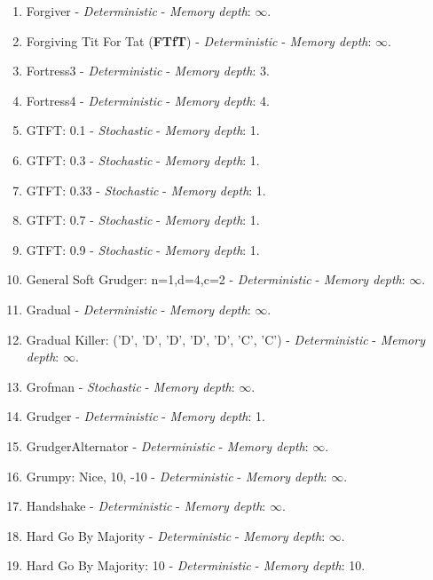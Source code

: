 \documentclass[10pt,letterpaper]{article}
\begin{document}
\begin{enumerate}
\item Forgiver - \textit{Deterministic} - \textit{Memory depth}: \(\infty\). \cite{axelrodproject}
\item Forgiving Tit For Tat (\textbf{FTfT}) - \textit{Deterministic} - \textit{Memory depth}: \(\infty\). \cite{axelrodproject}
\item Fortress3 - \textit{Deterministic} - \textit{Memory depth}: 3. \cite{Ashlock2006}
\item Fortress4 - \textit{Deterministic} - \textit{Memory depth}: 4. \cite{Ashlock2006}
\item GTFT: 0.1 - \textit{Stochastic} - \textit{Memory depth}: 1.
\item GTFT: 0.3 - \textit{Stochastic} - \textit{Memory depth}: 1.
\item GTFT: 0.33 - \textit{Stochastic} - \textit{Memory depth}: 1. \cite{Gaudesi2016, Nowak1993}
\item GTFT: 0.7 - \textit{Stochastic} - \textit{Memory depth}: 1.
\item GTFT: 0.9 - \textit{Stochastic} - \textit{Memory depth}: 1.
\item General Soft Grudger: n=1,d=4,c=2 - \textit{Deterministic} - \textit{Memory depth}: \(\infty\). \cite{axelrodproject}
\item Gradual - \textit{Deterministic} - \textit{Memory depth}: \(\infty\). \cite{Beaufils1997}
\item Gradual Killer: ('D', 'D', 'D', 'D', 'D', 'C', 'C') - \textit{Deterministic} - \textit{Memory depth}: \(\infty\). \cite{Prison1998}
\item Grofman - \textit{Stochastic} - \textit{Memory depth}: \(\infty\). \cite{Axelrod1980}
\item Grudger - \textit{Deterministic} - \textit{Memory depth}: 1. \cite{Axelrod1980, Banks1990, Beaufils1997, Berg2015, Li2011}
\item GrudgerAlternator - \textit{Deterministic} - \textit{Memory depth}: \(\infty\). \cite{Prison1998}
\item Grumpy: Nice, 10, -10 - \textit{Deterministic} - \textit{Memory depth}: \(\infty\). \cite{axelrodproject}
\item Handshake - \textit{Deterministic} - \textit{Memory depth}: \(\infty\). \cite{Robson1990}
\item Hard Go By Majority - \textit{Deterministic} - \textit{Memory depth}: \(\infty\). \cite{Mittal2009}
\item Hard Go By Majority: 10 - \textit{Deterministic} - \textit{Memory depth}: 10. \cite{axelrodproject}

\end{enumerate}
\end{document}
